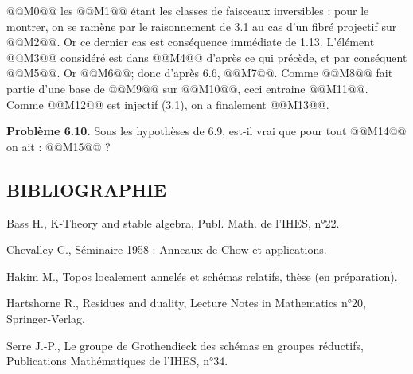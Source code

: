 
@@M0@@
les @@M1@@
étant les classes de faisceaux inversibles : pour le montrer, on se ramène par le raisonnement de 3.1 au cas d'un fibré projectif sur @@M2@@. Or ce dernier cas est conséquence immédiate de 1.13. L'élément @@M3@@ considéré est dans @@M4@@ d'après ce qui précède, et par conséquent @@M5@@. Or @@M6@@; donc d'après 6.6, @@M7@@. Comme @@M8@@ fait partie d'une base de @@M9@@ sur @@M10@@, ceci entraine @@M11@@. Comme @@M12@@ est injectif (3.1), on a finalement @@M13@@.

\textbf{Problème 6.10.} Sous les hypothèses de 6.9, est-il vrai que pour tout @@M14@@ on ait : @@M15@@ ?

\subsection*{BIBLIOGRAPHIE}
\begin{enumerate}[label={\textup{[\arabic*]}}]
\item Bass H., K-Theory and stable algebra, Publ. Math. de l'IHES, n°22.
\item Chevalley C., Séminaire 1958 : Anneaux de Chow et applications.
\item Hakim M., Topos localement annelés et schémas relatifs, thèse (en préparation).
\item Hartshorne R., Residues and duality, Lecture Notes in Mathematics n°20, Springer-Verlag.
\item Serre J.-P., Le groupe de Grothendieck des schémas en groupes réductifs, Publications Mathématiques de l'IHES, n°34.
\end{enumerate}



\providecommand{\Kosz}{\mathrm K}
\providecommand{\Proj}{\operatorname{Proj}}
\providecommand{\Sym}{\operatorname{Sym}}
\providecommand{\gr}{\operatorname{gr}}
\providecommand{\Tor}{\operatorname{Tor}}
\providecommand{\Spec}{\operatorname{Spec}}
\providecommand{\Imf}{\operatorname{Im}}
\providecommand{\Ker}{\operatorname{Ker}}
\providecommand{\Id}{\operatorname{Id}}
\providecommand{\rad}{\operatorname{rad}}
\providecommand{\cO}{\mathcal O}
\providecommand{\cS}{\mathcal S}
\providecommand{\cJ}{\mathcal J}
\providecommand{\cN}{\mathcal N}
\providecommand{\bfP}{\mathbf P}
\providecommand{\bfA}{\mathbf A}



